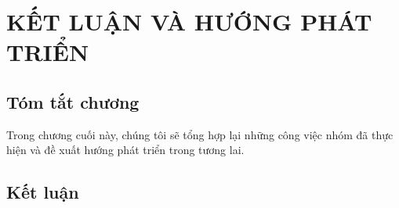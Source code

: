 
\chapter{KẾT LUẬN VÀ HƯỚNG PHÁT TRIỂN} %

\label{Chapter5} 

\section*{Tóm tắt chương}
Trong chương cuối này, chúng tôi sẽ tổng hợp lại những công việc nhóm đã thực hiện và đề xuất hướng phát triển trong tương lai.
\section{Kết luận}

